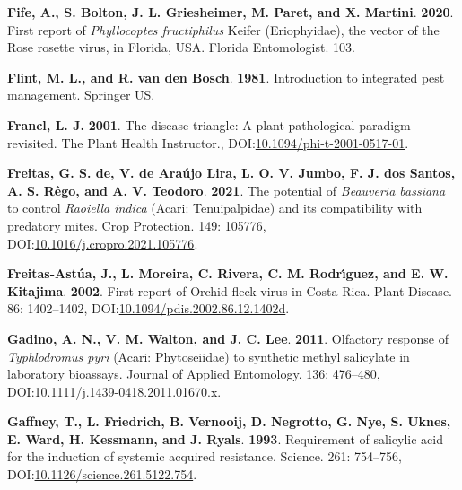 \documentclass[12pt,final,CPage]{ufthesis}
\newlength{\cslhangindent}
\newenvironment{CSLReferences}[2] %
{%
	\setlength{\parindent}{0pt}
	\ifodd #1 \everypar{\setlength{\hangindent}{\cslhangindent}}\ignorespaces\fi
	\ifnum #2 > 0
	\setlength{\parskip}{#2\baselineskip}
	\fi
}%
{}
\begin{document}
{\begin{CSLReferences}{1}{0}
  \leavevmode{}%
  \textbf{Fife, A., S. Bolton, J. L. Griesheimer, M. Paret, and X. Martini}. \textbf{2020}. First report of {\emph{Phyllocoptes fructiphilus}} {Keifer} ({Eriophyidae}), the vector of the {Rose rosette virus}, in {Florida}, {USA}. Florida Entomologist. 103.

  \leavevmode{}%
  \textbf{Flint, M. L., and R. van den Bosch}. \textbf{1981}. Introduction to integrated pest management. Springer {US}.

  \leavevmode{}%
  \textbf{Francl, L. J.} \textbf{2001}. The disease triangle: A plant pathological paradigm revisited. The Plant Health Instructor., DOI:\href{https://doi.org/10.1094/phi-t-2001-0517-01}{10.1094/phi-t-2001-0517-01}.

  \leavevmode{}%
  \textbf{Freitas, G. S. de, V. de Araújo Lira, L. O. V. Jumbo, F. J. dos Santos, A. S. Rêgo, and A. V. Teodoro}. \textbf{2021}. The potential of {\emph{Beauveria bassiana}} to control {\emph{Raoiella indica}} ({Acari}: {Tenuipalpidae}) and its compatibility with predatory mites. Crop Protection. 149: 105776, DOI:\href{https://doi.org/10.1016/j.cropro.2021.105776}{10.1016/j.cropro.2021.105776}.

  \leavevmode{}%
  \textbf{Freitas-Astúa, J., L. Moreira, C. Rivera, C. M. Rodrı́guez, and E. W. Kitajima}. \textbf{2002}. First report of {Orchid fleck virus} in {Costa Rica}. Plant Disease. 86: 1402--1402, DOI:\href{https://doi.org/10.1094/pdis.2002.86.12.1402d}{10.1094/pdis.2002.86.12.1402d}.

  \leavevmode{}%
  \textbf{Gadino, A. N., V. M. Walton, and J. C. Lee}. \textbf{2011}. Olfactory response of {\emph{Typhlodromus pyri}} {({Acari}: {Phytoseiidae})} to synthetic methyl salicylate in laboratory bioassays. Journal of Applied Entomology. 136: 476--480, DOI:\href{https://doi.org/10.1111/j.1439-0418.2011.01670.x}{10.1111/j.1439-0418.2011.01670.x}.

  \leavevmode{}%
  \textbf{Gaffney, T., L. Friedrich, B. Vernooij, D. Negrotto, G. Nye, S. Uknes, E. Ward, H. Kessmann, and J. Ryals}. \textbf{1993}. Requirement of salicylic acid for the induction of systemic acquired resistance. Science. 261: 754--756, DOI:\href{https://doi.org/10.1126/science.261.5122.754}{10.1126/science.261.5122.754}.


\end{CSLReferences}}
\end{document}

